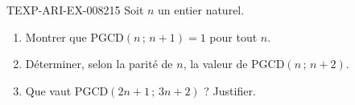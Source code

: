 \begin{exercice}{TEXP-ARI-EX-008}{2}{15}
Soit $n$ un entier naturel.
\begin{enumerate}
  \item Montrer que $\mathrm{PGCD}(n\,;\,n+1)=1$ pour tout $n$.
  \item Déterminer, selon la parité de $n$, la valeur de
        $\mathrm{PGCD}(n\,;\,n+2)$.
  \item Que vaut $\mathrm{PGCD}(2n+1\,;\,3n+2)$ ? Justifier.
\end{enumerate}
\end{exercice}
